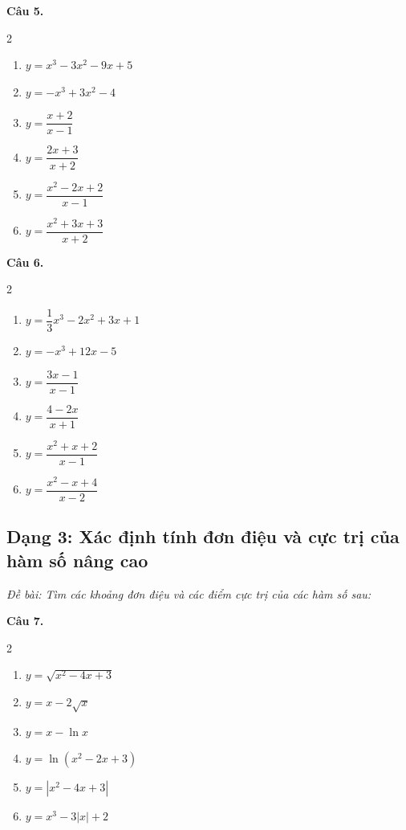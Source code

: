 \documentclass[12pt]{article}
\begin{document}
	\begin{btvang}
		\textbf{Câu 5.}
		\begin{multicols}{2}
			\begin{enumerate}[label=\alph*)]
				\item $y = x^3 - 3x^2 - 9x + 5$
				\item $y = -x^3 + 3x^2 - 4$
				\item $y = \dfrac{x + 2}{x - 1}$
				\item $y = \dfrac{2x + 3}{x + 2}$
				\item $y = \dfrac{x^2 - 2x + 2}{x - 1}$
				\item $y = \dfrac{x^2 + 3x + 3}{x + 2}$
			\end{enumerate}
		\end{multicols}
	\end{btvang}
	
	\begin{btdo}
		\textbf{Câu 6.}
		\begin{multicols}{2}
			\begin{enumerate}[label=\alph*)]
				\item $y = \dfrac{1}{3}x^3 - 2x^2 + 3x + 1$
				\item $y = -x^3 + 12x - 5$
				\item $y = \dfrac{3x - 1}{x - 1}$
				\item $y = \dfrac{4 - 2x}{x + 1}$
				\item $y = \dfrac{x^2 + x + 2}{x - 1}$
				\item $y = \dfrac{x^2 - x + 4}{x - 2}$
			\end{enumerate}
		\end{multicols}
	\end{btdo}
	
	\subsection{Dạng 3: Xác định tính đơn điệu và cực trị của hàm số nâng cao}
	\textit{Đề bài: Tìm các khoảng đơn điệu và các điểm cực trị của các hàm số  sau:}
	
	\begin{btxanh}
		\textbf{Câu 7.}
		\begin{multicols}{2}
			\begin{enumerate}[label=\alph*)]
				\item $y = \sqrt{x^2 - 4x + 3}$
				\item $y = x - 2\sqrt{x}$
				\item $y = x - \ln x$
				\item $y = \ln(x^2 - 2x + 3)$
				\item $y = |x^2 - 4x + 3|$
				\item $y = x^3 - 3|x| + 2$
			\end{enumerate}
		\end{multicols}
	\end{btxanh}
	
\end{document}
